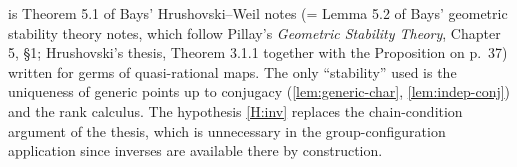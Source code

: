 \begin{remark}
 is Theorem 5.1 of Bays' Hrushovski--Weil notes (= Lemma 5.2 of Bays'
geometric stability theory notes, which follow Pillay's \emph{Geometric Stability
Theory}, Chapter 5, \S1; Hrushovski's thesis, Theorem 3.1.1 together with the
Proposition on p.~37) written for germs of quasi-rational maps.  The only
``stability'' used is the uniqueness of generic points up to conjugacy
(\cref{lem:generic-char}, \cref{lem:indep-conj}) and the rank calculus.  The hypothesis
\ref{H:inv} replaces the chain-condition argument of the thesis, which is unnecessary in
the group-configuration application since inverses are available there by construction.
\end{remark}
